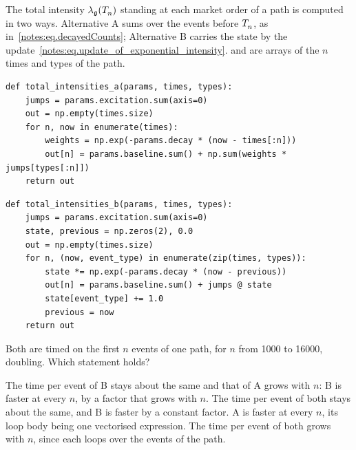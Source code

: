 \begin{question}
\label{question.intensityByRecursionAgainstSum}
The total intensity $\totalIntensity(\arrivalTimes[]_{n})$ standing at each market order of a path
is computed in two ways.
Alternative A sums over the events before $\arrivalTimes[]_{n}$, as in~\eqref{notes:eq.decayedCounts};
Alternative B carries the state by the update~\eqref{notes:eq.update_of_exponential_intensity}.
 and  are arrays of the $n$ times and types of the path.
\begin{lstlisting}[caption={Alternative A}, label=listing.intensityByRecursionAgainstSumA]
def total_intensities_a(params, times, types):
    jumps = params.excitation.sum(axis=0)
    out = np.empty(times.size)
    for n, now in enumerate(times):
        weights = np.exp(-params.decay * (now - times[:n]))
        out[n] = params.baseline.sum() + np.sum(weights * jumps[types[:n]])
    return out
\end{lstlisting}
\begin{lstlisting}[caption={Alternative B}, label=listing.intensityByRecursionAgainstSumB]
def total_intensities_b(params, times, types):
    jumps = params.excitation.sum(axis=0)
    state, previous = np.zeros(2), 0.0
    out = np.empty(times.size)
    for n, (now, event_type) in enumerate(zip(times, types)):
        state *= np.exp(-params.decay * (now - previous))
        out[n] = params.baseline.sum() + jumps @ state
        state[event_type] += 1.0
        previous = now
    return out
\end{lstlisting}
Both are timed on the first $n$ events of one path,
for $n$ from 1000 to 16000, doubling.
Which statement holds?
\begin{choices}
 \correctchoice The time per event of B stays about the same and that of A grows with $n$:
  B is faster at every $n$, by a factor that grows with $n$.
 \choice The time per event of both stays about the same,
  and B is faster by a constant factor.
 \choice A is faster at every $n$, its loop body being one vectorised expression.
 \choice The time per event of both grows with $n$,
  since each loops over the events of the path.
\end{choices}
\end{question}

